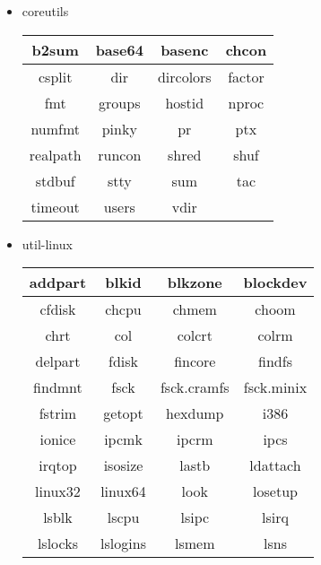 \begin{itemize}
    \item coreutils
        \begin{center}
            \begin{tabular}{|c|c|c|c|}
                \hline
                b2sum & base64 & basenc & chcon \\
                \hline
                csplit & dir & dircolors & factor \\
                \hline
                fmt & groups & hostid & nproc \\
                \hline
                numfmt & pinky & pr & ptx \\
                \hline
                realpath & runcon & shred & shuf \\
                \hline
                stdbuf & stty & sum & tac \\
                \hline
                timeout & users & vdir \\
                \cline{1-3}
            \end{tabular}
        \end{center}
    \item util-linux
        \begin{center}
            \begin{tabular}{|c|c|c|c|}
                \hline
                addpart & blkid & blkzone & blockdev \\
                \hline
                cfdisk & chcpu & chmem & choom \\
                \hline
                chrt & col & colcrt & colrm \\
                \hline
                delpart & fdisk & fincore & findfs \\
                \hline
                findmnt & fsck & fsck.cramfs & fsck.minix \\
                \hline
                fstrim & getopt & hexdump & i386 \\
                \hline
                ionice & ipcmk & ipcrm & ipcs \\
                \hline
                irqtop & isosize & lastb & ldattach \\
                \hline
                linux32 & linux64 & look & losetup \\
                \hline
                lsblk & lscpu & lsipc & lsirq \\
                \hline
                lslocks & lslogins & lsmem & lsns \\

\end{tabular}
\end{center}
\end{itemize}
